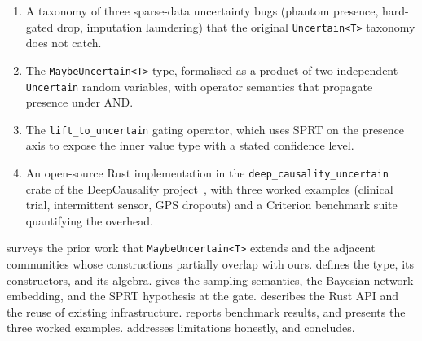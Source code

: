 \begin{enumerate}
  \item A taxonomy of three sparse-data uncertainty bugs (phantom presence,
        hard-gated drop, imputation laundering) that the original
        \texttt{Uncertain<T>} taxonomy does not catch.
  \item The \texttt{MaybeUncertain<T>} type, formalised as a product of two
        independent \texttt{Uncertain} random variables, with operator
        semantics that propagate presence under AND.
  \item The \texttt{lift\_to\_uncertain} gating operator, which uses SPRT on
        the presence axis to expose the inner value type with a stated
        confidence level.
  \item An open-source Rust implementation in the \texttt{deep\_causality\_uncertain}
        crate of the DeepCausality project~\cite{hansen_deepcausality}, with
        three worked examples (clinical trial, intermittent sensor, GPS dropouts)
        and a Criterion benchmark suite quantifying the overhead.
\end{enumerate}

 surveys the prior work that
\texttt{MaybeUncertain<T>} extends and the adjacent communities whose
constructions partially overlap with ours. 
defines the type, its constructors, and its algebra. 
gives the sampling semantics, the Bayesian-network embedding, and the SPRT
hypothesis at the gate.  describes the Rust API and
the reuse of existing infrastructure.  reports
benchmark results, and  presents the three worked examples.
 addresses limitations honestly, and
 concludes.
